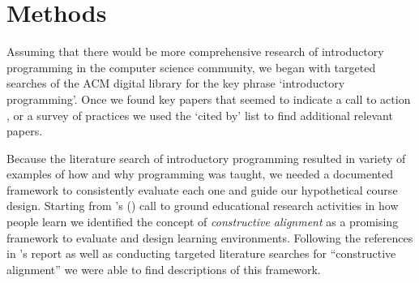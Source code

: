 \documentclass[12pt]{article}
\begin{document}



\section*{Methods}
Assuming that there would be more comprehensive research of
introductory programming in the computer science community, we began
with targeted searches of the ACM digital library for the key phrase
`introductory programming'. Once we found key papers that seemed to
indicate a call to action
\autocite[e.g.][]{mccracken_multinational_2001,kolling_problem_1999},
or a survey of practices
\autocite[e.g.][]{pears_survey_2007-1,robins_learning_2003} we used
the `cited by' list to find additional relevant papers.

Because the literature search of introductory programming resulted in
variety of examples of how and why programming was taught, we needed a
documented framework to consistently evaluate each one and guide our
hypothetical course design. Starting from
\citeauthor{jamieson_creating_2009}'s
(\citeyear{jamieson_creating_2009}) call to ground educational
research activities in how people learn we identified the concept of
\emph{constructive alignment} as a promising framework to evaluate and
design learning environments. Following the references in
\citeauthor{jamieson_creating_2009}'s report as well as conducting
targeted literature searches for ``constructive alignment'' we were
able to find descriptions of this
framework\autocite{jamieson_creating_2009,pellegrino_rethinking_2006,felder_designing_2003,biggs_enhancing_1996}.

\end{document}
